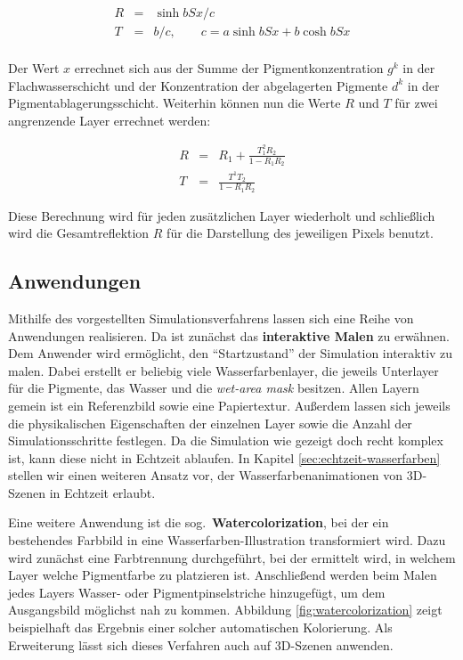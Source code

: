 \begin{eqnarray*}
R &=& \sinh b S x/c \\
T &=& b/c, \qquad c = a \sinh b S x + b \cosh b S x \\
\end{eqnarray*}

Der Wert $x$ errechnet sich aus der Summe der Pigmentkonzentration $g^k$ in der 
Flachwasserschicht und der Konzentration der abgelagerten Pigmente $d^k$ in der 
Pigmentablagerungsschicht. Weiterhin können nun die Werte $R$ und $T$ für zwei 
angrenzende Layer errechnet werden:

\begin{eqnarray*}
  R &=& R_1 + \frac{T^2_1 R_2}{1 - R_1 R_2} \\
  T &=& \frac{T^1 T_2}{1 - R_1 R_2}
\end{eqnarray*}

Diese Berechnung wird für jeden zusätzlichen Layer wiederholt und schließlich
wird die Gesamtreflektion $R$ für die Darstellung des jeweiligen Pixels benutzt.

\subsection{Anwendungen}
Mithilfe des vorgestellten Simulationsverfahrens lassen sich eine Reihe von
Anwendungen realisieren.
Da ist zunächst das \textbf{interaktive Malen} zu erwähnen. Dem Anwender wird
ermöglicht, den "`Startzustand"' der Simulation interaktiv zu malen. Dabei
erstellt er beliebig viele Wasserfarbenlayer, die jeweils Unterlayer für die
Pigmente, das Wasser und die \textsl{wet-area mask} besitzen. Allen Layern
gemein ist ein Referenzbild sowie eine Papiertextur. Außerdem lassen sich
jeweils die physikalischen Eigenschaften der einzelnen Layer sowie die Anzahl
der Simulationsschritte festlegen.
Da die Simulation wie gezeigt doch recht komplex ist, kann diese nicht in
Echtzeit ablaufen. In Kapitel \ref{sec:echtzeit-wasserfarben} stellen wir einen
weiteren Ansatz vor, der Wasserfarbenanimationen von 3D-Szenen in Echtzeit 
erlaubt.

Eine weitere Anwendung ist die sog.\ \textbf{Watercolorization}, bei der ein 
bestehendes Farbbild in eine Wasserfarben-Illustration transformiert wird. Dazu 
wird zunächst eine Farbtrennung durchgeführt, bei der ermittelt wird, in 
welchem Layer welche Pigmentfarbe zu platzieren ist. Anschließend werden beim 
Malen jedes Layers Wasser- oder Pigmentpinselstriche hinzugefügt, um dem 
Ausgangsbild möglichst nah zu kommen. Abbildung \ref{fig:watercolorization} 
zeigt beispielhaft das Ergebnis einer solcher automatischen Kolorierung. Als 
Erweiterung lässt sich dieses Verfahren auch auf 3D-Szenen anwenden.

